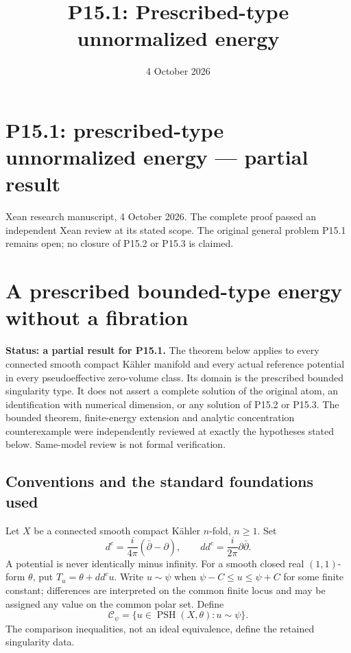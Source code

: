 \documentclass[
  11pt,
]{article}
\title{P15.1: Prescribed-type unnormalized energy}
\author{}
\date{4 October 2026}
\begin{document}
\maketitle

\section{P15.1: prescribed-type unnormalized energy --- partial
result}\label{p15.1-prescribed-type-unnormalized-energy-partial-result}

Xean research manuscript, 4 October 2026. The complete proof passed an
independent Xean review at its stated scope. The original general problem
P15.1 remains open; no closure of P15.2 or P15.3 is claimed.

\section{A prescribed bounded-type energy without a
fibration}\label{a-prescribed-bounded-type-energy-without-a-fibration}

\textbf{Status: a partial result for P15.1.} The theorem below applies
to every connected smooth compact Kähler manifold and every actual
reference potential in every pseudoeffective zero-volume class. Its
domain is the prescribed bounded singularity type. It does not assert a
complete solution of the original atom, an identification with numerical
dimension, or any solution of P15.2 or P15.3. The bounded theorem, finite-energy extension and analytic concentration
counterexample were independently reviewed at exactly the hypotheses
stated below. Same-model review is not formal verification.

\subsection{Conventions and the standard foundations
used}\label{conventions-and-the-standard-foundations-used}

Let \(X\) be a connected smooth compact Kähler \(n\)-fold, \(n\geq1\).
Set \[
d^c=\frac{i}{4\pi}(\bar\partial-\partial),\qquad dd^c=\frac{i}{2\pi}\partial\bar\partial.
\] A potential is never identically minus infinity. For a smooth closed
real \((1,1)\)-form \(\theta\), put \(T_u=\theta+dd^cu\). Write
\(u\sim\psi\) when \(\psi-C\leq u\leq\psi+C\) for some finite constant;
differences are interpreted on the common finite locus and may be
assigned any value on the common polar set. Define \[
\mathcal{C}_\psi=\{u\in\operatorname{PSH}(X,\theta):u\sim\psi\}.
\] The comparison inequalities, not an ideal equivalence, define the
retained singularity data.
\end{document}
